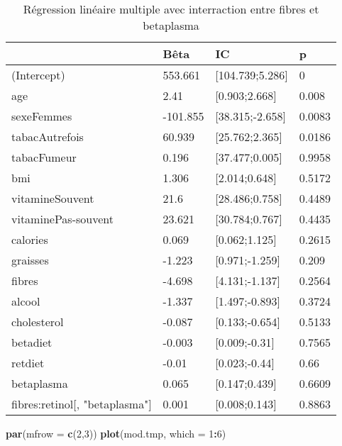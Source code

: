 \documentclass[]{article}
\newenvironment{Shaded}{\begin{snugshade}}{\end{snugshade}}
\newcommand{\KeywordTok}[1]{\textcolor[rgb]{0.13,0.29,0.53}{\textbf{#1}}}
\newcommand{\DataTypeTok}[1]{\textcolor[rgb]{0.13,0.29,0.53}{#1}}
\newcommand{\DecValTok}[1]{\textcolor[rgb]{0.00,0.00,0.81}{#1}}
\newcommand{\OperatorTok}[1]{\textcolor[rgb]{0.81,0.36,0.00}{\textbf{#1}}}
\newcommand{\NormalTok}[1]{#1}
\begin{document}
\begin{table}

\caption{\label{tab:unnamed-chunk-76}Régression linéaire multiple avec interraction entre fibres et betaplasma}
\centering
\begin{tabular}[t]{l|l|l|l}
\hline
  & Bêta & IC & p\\
\hline
\rowcolor[HTML]{BBD2E1}  (Intercept) & 553.661 & [104.739;5.286] & 0\\
\hline
age & 2.41 & [0.903;2.668] & 0.008\\
\hline
\rowcolor[HTML]{BBD2E1}  sexeFemmes & -101.855 & [38.315;-2.658] & 0.0083\\
\hline
tabacAutrefois & 60.939 & [25.762;2.365] & 0.0186\\
\hline
\rowcolor[HTML]{BBD2E1}  tabacFumeur & 0.196 & [37.477;0.005] & 0.9958\\
\hline
bmi & 1.306 & [2.014;0.648] & 0.5172\\
\hline
\rowcolor[HTML]{BBD2E1}  vitamineSouvent & 21.6 & [28.486;0.758] & 0.4489\\
\hline
vitaminePas-souvent & 23.621 & [30.784;0.767] & 0.4435\\
\hline
\rowcolor[HTML]{BBD2E1}  calories & 0.069 & [0.062;1.125] & 0.2615\\
\hline
graisses & -1.223 & [0.971;-1.259] & 0.209\\
\hline
\rowcolor[HTML]{BBD2E1}  fibres & -4.698 & [4.131;-1.137] & 0.2564\\
\hline
alcool & -1.337 & [1.497;-0.893] & 0.3724\\
\hline
\rowcolor[HTML]{BBD2E1}  cholesterol & -0.087 & [0.133;-0.654] & 0.5133\\
\hline
betadiet & -0.003 & [0.009;-0.31] & 0.7565\\
\hline
\rowcolor[HTML]{BBD2E1}  retdiet & -0.01 & [0.023;-0.44] & 0.66\\
\hline
betaplasma & 0.065 & [0.147;0.439] & 0.6609\\
\hline
\rowcolor[HTML]{BBD2E1}  fibres:retinol[, "betaplasma"] & 0.001 & [0.008;0.143] & 0.8863\\
\hline
\end{tabular}
\end{table}

\begin{Shaded}
\begin{Highlighting}[]
\KeywordTok{par}\NormalTok{(}\DataTypeTok{mfrow =} \KeywordTok{c}\NormalTok{(}\DecValTok{2}\NormalTok{,}\DecValTok{3}\NormalTok{))}
\KeywordTok{plot}\NormalTok{(mod.tmp, }\DataTypeTok{which =} \DecValTok{1}\OperatorTok{:}\DecValTok{6}\NormalTok{)}
\end{Highlighting}
\end{Shaded}
\end{document}
